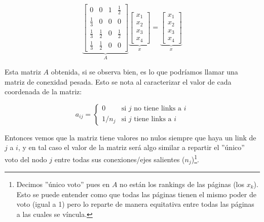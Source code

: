\begin{equation}
    \underbrace{
        \begin{bmatrix}
                0& 0& 1& \frac{1}{2}\\[-0.65em]
                \frac{1}{3}& 0& 0& 0\\[-0.65em]
                \frac{1}{3}& \frac{1}{2}& 0& \frac{1}{2}\\[-0.65em]
                \frac{1}{3}& \frac{1}{2}& 0& 0
        \end{bmatrix}
    }_A
    \underbrace{
        \begin{bmatrix}
            x_1\\[-0.65em]
            x_2\\[-0.65em]
            x_3\\[-0.65em]
            x_4
        \end{bmatrix}
    }_x
    =
    \underbrace{
        \begin{bmatrix}
            x_1\\[-0.65em]
            x_2\\[-0.65em]
            x_3\\[-0.65em]
            x_4
        \end{bmatrix}
    }_x
\end{equation}

\par Esta matriz $A$ obtenida, si se observa bien, es lo que podr\'iamos llamar
una matriz de conexidad pesada. Esto se nota al caracterizar el valor de cada
coordenada de la matriz:

\begin{equation}
    a_{ij} =
    \begin{cases}
        0       &\text{si $j$ no tiene links a $i$}\\
        1/n_j   &\text{si $j$ tiene links a $i$}
    \end{cases}
\end{equation}

\par Entonces vemos que la matriz tiene valores no nulos siempre que haya un
link de $j$ a $i$, y en tal caso el valor de la matriz ser\'a algo similar a
repartir el ''\'unico'' voto del nodo $j$ entre todas sus conexiones/ejes
salientes ($n_j$)\footnote{Decimos ''\'unico voto'' pues en $A$ no est\'an los
rankings de las p\'aginas (los $x_k$). Esto se puede entender como que todas las
p\'aginas tienen el mismo poder de voto (igual a 1) pero lo reparte de manera
equitativa entre todas las p\'aginas a las cuales se v\'incula.}.
\medskip

